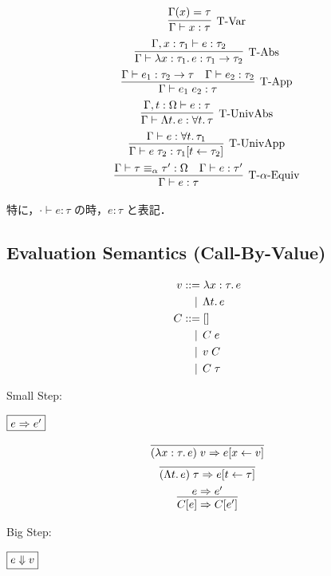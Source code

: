 \begin{gather*}
  \infer[\text{T-Var}]{\Gamma \vdash x: \tau}{
    \Gamma(x) = \tau
  }
  \\
  \infer[\text{T-Abs}]{\Gamma \vdash \lambda x: \tau_1\ldotp e: \tau_1 \to \tau_2}{
    \Gamma, x: \tau_1 \vdash e: \tau_2
  }
  \\
  \infer[\text{T-App}]{\Gamma \vdash e_1\; e_2: \tau}{
    \Gamma \vdash e_1: \tau_2 \to \tau
    &
    \Gamma \vdash e_2: \tau_2
  }
  \\
  \infer[\text{T-UnivAbs}]{\Gamma \vdash \Lambda t\ldotp e: \forall t\ldotp \tau}{
    \Gamma, t: \Omega \vdash e: \tau
  }
  \\
  \infer[\text{T-UnivApp}]{\Gamma \vdash e\; \tau_2: \tau_1[t \assign \tau_2]}{
    \Gamma \vdash e: \forall t\ldotp \tau_1
  }
  \\
  \infer[\text{T-$\alpha$-Equiv}]{\Gamma \vdash e: \tau}{
    \Gamma \vdash \tau \equiv_\alpha \tau': \Omega
    &
    \Gamma \vdash e: \tau'
  }
\end{gather*}

特に，$\cdot \vdash e: \tau$ の時，$e: \tau$ と表記．

\subsection{Evaluation Semantics (Call-By-Value)}

\begin{align*}
  v
  &\BNFassign \lambda x: \tau\ldotp e \\
  &\BNFor \Lambda t\ldotp e \\
  C
  &\BNFassign [] \\
  &\BNFor C\; e \\
  &\BNFor v\; C \\
  &\BNFor C\; \tau
\end{align*}

Small Step:

$\fbox{$e \Rightarrow e'$}$

\begin{gather*}
  \infer{(\lambda x: \tau\ldotp e)\; v \smalleval e[x \assign v]}{}
  \\
  \infer{(\Lambda t\ldotp e)\; \tau \smalleval e[t \assign \tau]}{}
  \\
  \infer{C[e] \smalleval C[e']}{
    e \smalleval e'
  }
\end{gather*}

Big Step:

$\fbox{$e \Downarrow v$}$

